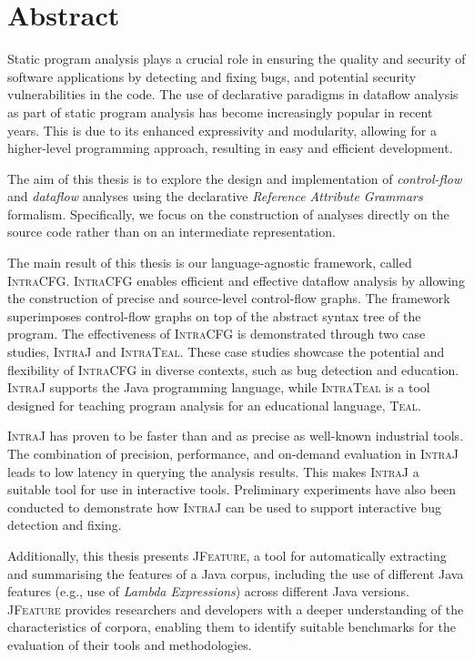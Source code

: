 \chapter{Abstract}

\vspace{-0.5cm}
Static program analysis plays a crucial role in ensuring the quality and security of
software applications by detecting and fixing bugs,
and potential security vulnerabilities in the code. The use of declarative
paradigms in dataflow analysis as part of static program analysis has become
increasingly popular in recent years. This is due to its enhanced expressivity
and modularity, allowing for a higher-level programming approach, resulting in
easy and efficient development.

The aim of this thesis is to explore the design and implementation of \emph{control-flow} and
\emph{dataflow} analyses using the declarative \emph{Reference Attribute Grammars} formalism.
Specifically, we focus on the construction of analyses directly on the source code
rather than on an intermediate representation.

The main result of this thesis is our language-agnostic framework, called \textsc{IntraCFG}.
\textsc{IntraCFG} enables efficient and effective dataflow analysis by allowing the construction of precise and
source-level control-flow graphs. The framework superimposes control-flow
graphs on top of the abstract syntax tree of the program.
The effectiveness of \textsc{IntraCFG} is demonstrated through two case studies,
\textsc{IntraJ} and \textsc{IntraTeal}. These case studies showcase the potential and
flexibility of \textsc{IntraCFG} in diverse contexts, such as bug detection and education.
\textsc{IntraJ} supports the Java programming language, while
\textsc{IntraTeal} is a tool designed for teaching program analysis for an educational language, \textsc{Teal}.

\textsc{IntraJ} has proven to be faster than and as precise as well-known
industrial tools.
The combination of precision, performance, and on-demand evaluation in \textsc{IntraJ}
leads to low latency in querying the analysis results. This makes \textsc{IntraJ} a
suitable tool for use in interactive tools. Preliminary experiments have also
been conducted to demonstrate how \textsc{IntraJ} can be used to support interactive
bug detection and fixing.

Additionally, this thesis presents \textsc{JFeature}, a tool for automatically extracting
and summarising the features of a Java corpus, including the use of different Java features (e.g., use of \emph{Lambda Expressions}) across different
Java versions. \textsc{JFeature} provides
researchers and developers with a deeper understanding of the characteristics of
corpora, enabling them to identify suitable benchmarks for the evaluation of their
tools and methodologies.
